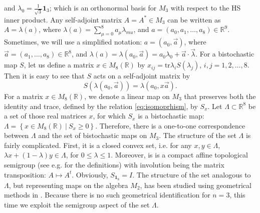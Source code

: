 \documentclass[12pt]{article}
\theoremstyle{plain}
\theoremstyle{definition}
\theoremstyle{remark}
\numberwithin{equation}{section}
\begin{document}
and $\lambda_{0} = \frac{1}{\sqrt{3}} \mathbf{1}_{3}$;
which is an orthonormal basis for $M_{3}$ with respect to the HS inner product.
Any self-adjoint matrix $A = A^{*} \in M_{3}$ can be written as
$A = \lambda(a)$, where
$\lambda(a) = \sum_{\mu=0}^{8} a_{\mu} \lambda_{mu}$,
and 
$a = (a_{0}, a_{1}, \ldots, a_{8}) \in \mathbb{R}^{9}$.
Sometimes, we will use a simplified notation:
$a = (a_{0}, \vec{a})$,
where $\vec{a} = (a_{1},\ldots,a_{8}) \in \mathbb{R}^{8}$,
and $\lambda(a) = \lambda(a_{0}, \vec{a}) = a_{0} \lambda_{0} + \vec{a} \cdot \vec{\lambda}$.
For a bistochastic map $S$,
let us define a matrix $x \in M_{8}(\mathbb{R})$ by
$x_{ij} = \text{tr} \lambda_{i} S(\lambda_{j})$,
$i,j = 1,2,\ldots,8$.
Then it is easy to see that $S$ acts on a self-adjoint matrix by
\begin{equation}
\label{eq:isomoprhism}
S(\lambda(a_{0}, \vec{a})) = \lambda(a_{0}, x \vec{a}).
\end{equation}
For a matrix $x \in M_{8}(\mathbb{R})$,
we denote a linear map on $M_{3}$ that preserves both the identity and trace,
defined by the relation \eqref{eq:isomoprhism},
by $S_{x}$.
Let $\Lambda \subset \mathbb{R}^{8}$ be a set of those real matrices $x$,
for which $S_{x}$ is a bistochastic map:
$\Lambda = \left \{ x \in M_{8}(\mathbb{R}) \: |  \: S_{x} \geq 0 \right \}$.
Therefore, there is a one-to-one correspondence between $\Lambda$
and the set of bistochastic maps on $M_{3}$.
The structure of the set $\Lambda$ is fairly complicated. 
First, it is a closed convex set, i.e. for any $x,y \in \Lambda$,
$\lambda x + (1-\lambda)y \in \Lambda$,
for $0 \leq \lambda \leq 1$.
Moreover, is is a compact affine topological semigroup
(see e.g. \cite{schwarz1955hausdorff,chow1975compact} for the definitions)
with involution being the matrix transposition: $A \mapsto A^{t}$.
Obviously,
$S_{\mathbf{1}_{8}} = I$.
The structure of the set analogous to $\Lambda$,
but representing maps on the algebra $M_{2}$,
has been studied using geometrical methods in \cite{miller2015topology}.
Because there is no such geometrical identification for $n = 3$,
this time we exploit the semigroup aspect of the set $\Lambda$.
\end{document}
